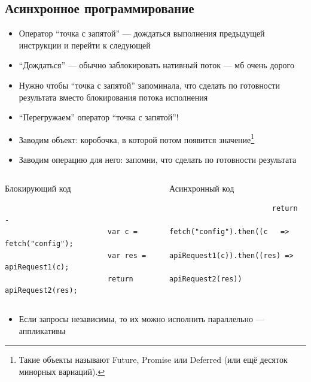     \subsection{Асинхронное программирование}

    \begin{frame}[fragile]{\subsecname}
        \vspace{-0.5em}
        \begin{itemize}
            \item Оператор ``точка с запятой'' --- дождаться выполнения предыдущей инструкции и перейти к следующей
            \item ``Дождаться'' --- обычно заблокировать нативный поток --- мб очень дорого
            \item Нужно чтобы ``точка с запятой'' запоминала, что сделать по готовности результата вместо блокирования потока исполнения
            \item ``Перегружаем'' оператор ``точка с запятой''!
            \item[\then] Заводим объект: коробочка, в которой потом появится значение\footnote{Такие объекты называют Future, Promise или Deferred (или ещё десяток минорных вариаций).}
            \item[\then] Заводим операцию для него: запомни, что сделать по готовности результата
        \end{itemize}
        \vspace{-1.7em}
        \begin{columns}
            \begin{column}[t]{0.45\textwidth}
                \begin{block}{Блокирующий код}
                    \begin{verbatim}
                                                            -
                        var c = fetch("config");
                        var res = apiRequest1(c);
                        return apiRequest2(res);
                    \end{verbatim}
                \end{block}
            \end{column}
            \begin{column}[t]{0.45\textwidth}
                \begin{block}{Асинхронный код}
                    \begin{verbatim}
                        return
                          fetch("config").then((c   =>
                          apiRequest1(c)).then((res) =>
                          apiRequest2(res))
                    \end{verbatim}
                \end{block}
            \end{column}
        \end{columns}
        \begin{itemize}
            \item Если запросы независимы, то их можно исполнить параллельно --- аппликативы
        \end{itemize}
    \end{frame}

